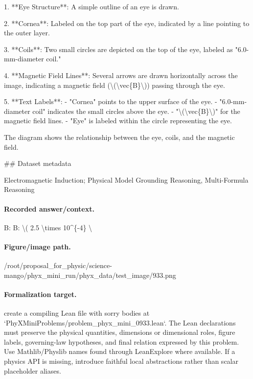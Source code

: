 1. **Eye Structure**: A simple outline of an eye is drawn.
   
2. **Cornea**: Labeled on the top part of the eye, indicated by a line pointing to the outer layer.
   
3. **Coils**: Two small circles are depicted on the top of the eye, labeled as "6.0-mm-diameter coil."
   
4. **Magnetic Field Lines**: Several arrows are drawn horizontally across the image, indicating a magnetic field (\textbackslash{}(\textbackslash{}vec\{B\}\textbackslash{})) passing through the eye.

5. **Text Labels**: 
   - "Cornea" points to the upper surface of the eye.
   - "6.0-mm-diameter coil" indicates the small circles above the eye.
   - "\textbackslash{}(\textbackslash{}vec\{B\}\textbackslash{})" for the magnetic field lines.
   - "Eye" is labeled within the circle representing the eye. 

The diagram shows the relationship between the eye, coils, and the magnetic field.

\#\# Dataset metadata

Electromagnetic Induction; Physical Model Grounding Reasoning, Multi-Formula Reasoning

\paragraph{Recorded answer/context.}
B: B: \textbackslash{}( 2.5 \textbackslash{}times 10\textasciicircum{}\{-4\} \textbackslash{}

\paragraph{Figure/image path.}
/root/proposal\_for\_physic/science-mango/phyx\_mini\_run/phyx\_data/test\_image/933.png

\paragraph{Formalization target.}
create a compiling Lean file with sorry bodies at `PhyXMiniProblems/problem\_phyx\_mini\_0933.lean`. The Lean declarations must preserve the physical quantities, dimensions or dimensional roles, figure labels, governing-law hypotheses, and final relation expressed by this problem.
Use Mathlib/Physlib names found through LeanExplore where available. If a physics API is missing, introduce faithful local abstractions rather than scalar placeholder aliases.


